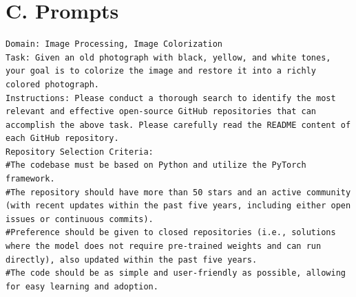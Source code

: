 \section*{C. Prompts}
\label{appendix:prompts}

\begin{lstlisting}[language={},caption={Prompts of DeepResearch for Suitable Repository.},label={lst:deepresearch}]
Domain: Image Processing, Image Colorization
Task: Given an old photograph with black, yellow, and white tones, your goal is to colorize the image and restore it into a richly colored photograph.
Instructions: Please conduct a thorough search to identify the most relevant and effective open-source GitHub repositories that can accomplish the above task. Please carefully read the README content of each GitHub repository.
Repository Selection Criteria:
#The codebase must be based on Python and utilize the PyTorch framework.
#The repository should have more than 50 stars and an active community (with recent updates within the past five years, including either open issues or continuous commits).
#Preference should be given to closed repositories (i.e., solutions where the model does not require pre-trained weights and can run directly), also updated within the past five years.
#The code should be as simple and user-friendly as possible, allowing for easy learning and adoption.
\end{lstlisting}


